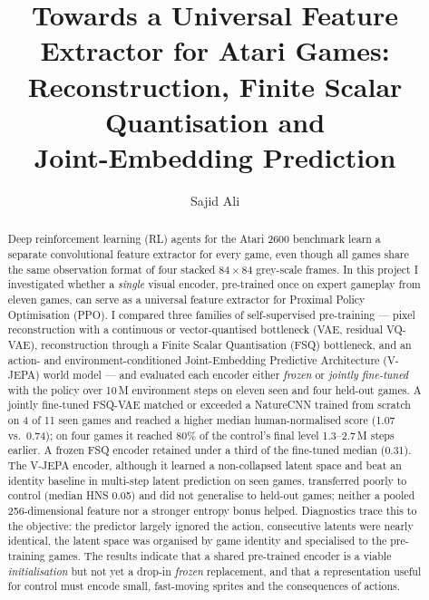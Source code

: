 \documentclass[runningheads]{llncs}
\begin{document}
\title{Towards a Universal Feature Extractor for Atari Games:\\
Reconstruction, Finite Scalar Quantisation and\\ Joint-Embedding Prediction}

\author{Sajid Ali}

\maketitle

\begin{abstract}
Deep reinforcement learning (RL) agents for the Atari 2600 benchmark learn a separate
convolutional feature extractor for every game, even though all games share the same
observation format of four stacked $84\times84$ grey-scale frames. In this project I
investigated whether a \emph{single} visual encoder, pre-trained once on expert
gameplay from eleven games, can serve as a universal feature extractor for Proximal
Policy Optimisation (PPO). I compared three families of self-supervised pre-training
--- pixel reconstruction with a continuous or vector-quantised bottleneck (VAE,
residual VQ-VAE), reconstruction through a Finite Scalar Quantisation (FSQ)
bottleneck, and an action- and environment-conditioned Joint-Embedding Predictive
Architecture (V-JEPA) world model --- and evaluated each encoder either
\emph{frozen} or \emph{jointly fine-tuned} with the policy over 10\,M environment
steps on eleven seen and four held-out games. A jointly fine-tuned FSQ-VAE
matched or exceeded a NatureCNN trained from scratch on 4 of 11 seen games and reached
a higher median human-normalised score (1.07 vs.\ 0.74); on four games it reached 80\%
of the control's final level 1.3--2.7\,M steps earlier. A frozen FSQ encoder retained under
a third of the fine-tuned median (0.31). The V-JEPA encoder, although it learned a
non-collapsed latent space and beat an identity baseline in multi-step latent prediction
on seen games, transferred poorly to control (median HNS 0.05) and did not generalise to
held-out games; neither a pooled 256-dimensional feature nor a stronger entropy bonus
helped. Diagnostics trace this to the objective: the predictor largely ignored the action,
consecutive latents were nearly identical, the latent space was organised by game identity
and specialised to the pre-training games. The results indicate that a shared pre-trained
encoder is a viable \emph{initialisation} but not yet a drop-in \emph{frozen} replacement,
and that a representation useful for control must encode small, fast-moving sprites and
the consequences of actions.

\end{abstract}
\end{document}
